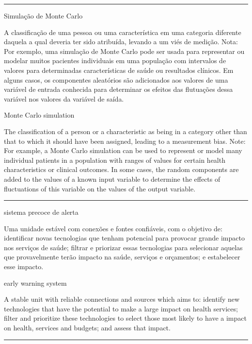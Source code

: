 \documentclass[
]{book}
\begin{document}
\begin{center}\rule{0.5\linewidth}{0.5pt}\end{center}

Simulação de Monte Carlo

A classificação de uma pessoa ou uma característica em uma categoria diferente daquela a qual deveria ter sido atribuída, levando a um viés de medição. Nota: Por exemplo, uma simulação de Monte Carlo pode ser usada para representar ou modelar muitos pacientes individuais em uma população com intervalos de valores para determinadas características de saúde ou resultados clínicos. Em alguns casos, os componentes aleatórios são adicionados aos valores de uma variável de entrada conhecida para determinar os efeitos das flutuações dessa variável nos valores da variável de saída.

Monte Carlo simulation

The classification of a person or a characteristic as being in a category other than that to which it should have been assigned, leading to a measurement bias. Note: For example, a Monte Carlo simulation can be used to represent or model many individual patients in a population with ranges of values for certain health characteristics or clinical outcomes. In some cases, the random components are added to the values of a known input variable to determine the effects of fluctuations of this variable on the values of the output variable.

\begin{center}\rule{0.5\linewidth}{0.5pt}\end{center}

sistema precoce de alerta

Uma unidade estável com conexões e fontes confiáveis, com o objetivo de: identificar novas tecnologias que tenham potencial para provocar grande impacto nos serviços de saúde; filtrar e priorizar essas tecnologias para selecionar aquelas que provavelmente terão impacto na saúde, serviços e orçamentos; e estabelecer esse impacto.

early warning system

A stable unit with reliable connections and sources which aims to: identify new technologies that have the potential to make a large impact on health services; filter and prioritize these technologies to select those most likely to have a impact on health, services and budgets; and assess that impact.

\begin{center}\rule{0.5\linewidth}{0.5pt}\end{center}
\end{document}
